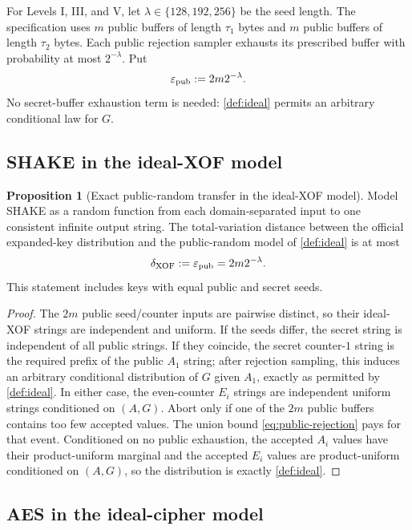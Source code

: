 \documentclass[11pt,a4paper]{article}
\theoremstyle{definition}
\newtheorem{proposition}[theorem]{Proposition}
\theoremstyle{remark}
\begin{document}
For Levels I, III, and V, let $\lambda\in\{128,192,256\}$ be the seed length.  The specification uses $m$ public buffers of length $\tau_1$ bytes and $m$ public buffers of length $\tau_2$ bytes.  Each public rejection sampler exhausts its prescribed buffer with probability at most $2^{-\lambda}$.  Put
\begin{equation}\label{eq:public-rejection}
\varepsilon_{\rm pub}:=2m2^{-\lambda}.
\end{equation}
No secret-buffer exhaustion term is needed: \cref{def:ideal} permits an arbitrary conditional law for $G$.

\subsection{SHAKE in the ideal-XOF model}

\begin{proposition}[Exact public-random transfer in the ideal-XOF model]\label{prop:rom-transfer}
Model SHAKE as a random function from each domain-separated input to one consistent infinite output string.  The total-variation distance between the official expanded-key distribution and the public-random model of \cref{def:ideal} is at most
\[
\delta_{\rm XOF}:=\varepsilon_{\rm pub}=2m2^{-\lambda}.
\]
This statement includes keys with equal public and secret seeds.
\end{proposition}

\begin{proof}
The $2m$ public seed/counter inputs are pairwise distinct, so their ideal-XOF strings are independent and uniform.  If the seeds differ, the secret string is independent of all public strings.  If they coincide, the secret counter-$1$ string is the required prefix of the public $A_1$ string; after rejection sampling, this induces an arbitrary conditional distribution of $G$ given $A_1$, exactly as permitted by \cref{def:ideal}.  In either case, the even-counter $E_i$ strings are independent uniform strings conditioned on $(A,G)$.  Abort only if one of the $2m$ public buffers contains too few accepted values.  The union bound \eqref{eq:public-rejection} pays for that event.  Conditioned on no public exhaustion, the accepted $A_i$ values have their product-uniform marginal and the accepted $E_i$ values are product-uniform conditioned on $(A,G)$, so the distribution is exactly \cref{def:ideal}.
\end{proof}

\subsection{AES in the ideal-cipher model}
\end{document}
